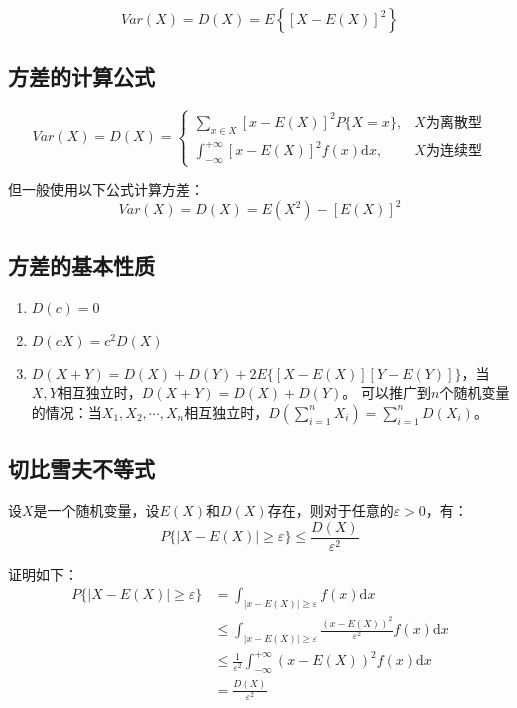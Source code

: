 \documentclass[a4paper,12pt]{ctexart}
\begin{document}
\begin{equation*}
	Var(X) = D(X) = E\left\{[X - E(X)]^2\right\}
\end{equation*}

\subsection{方差的计算公式}
\begin{equation*}
	Var(X) = D(X) = \begin{cases}
		\sum_{x\in X}[x - E(X)]^2P\{X = x\}, & X\text{为离散型} \\
		\int_{-\infty}^{+\infty}[x - E(X)]^2f(x)\mathrm{d}x, & X\text{为连续型}
	\end{cases}
\end{equation*}

但一般使用以下公式计算方差：
\begin{equation*}
	Var(X) = D(X) = E(X^2) - [E(X)]^2
\end{equation*}

\subsection{方差的基本性质}
\begin{enumerate}
	\item $D(c) = 0$
	\item $D(cX) = c^2D(X)$
	\item $D(X + Y) = D(X) + D(Y) + 2E\{[X - E(X)][Y - E(Y)]\}$，当$X,Y$相互独立时，$D(X + Y) = D(X) + D(Y)$。
	可以推广到$n$个随机变量的情况：当$X_1,X_2,\cdots,X_n$相互独立时，$D\left(\sum_{i=1}^nX_i\right) = \sum_{i=1}^nD(X_i)$。
\end{enumerate}

\subsection{切比雪夫不等式}

设$X$是一个随机变量，设$E(X)$和$D(X)$存在，则对于任意的$\varepsilon > 0$，有：
\begin{equation*}
	P\{|X - E(X)| \geq \varepsilon\} \leq \frac{D(X)}{\varepsilon^2}
\end{equation*}

证明如下：
\begin{align*}
	P\{|X - E(X)| \geq \varepsilon\} &= \int_{|x - E(X)| \geq \varepsilon}f(x)\mathrm{d}x \\
	&\leq \int_{|x - E(X)| \geq \varepsilon}\frac{(x - E(X))^2}{\varepsilon^2}f(x)\mathrm{d}x \\
	&\leq \frac{1}{\varepsilon^2}\int_{-\infty}^{+\infty}(x - E(X))^2f(x)\mathrm{d}x \\
	&= \frac{D(X)}{\varepsilon^2}
\end{align*}
\end{document}
